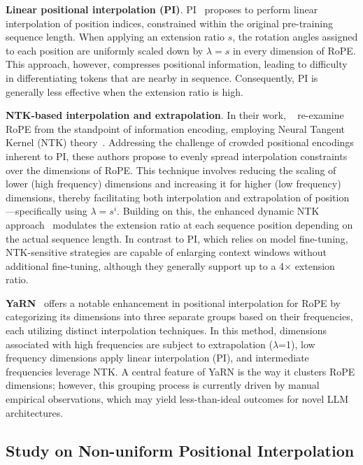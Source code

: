 \textbf{Linear positional interpolation (PI)}. PI~\cite{pi} proposes to perform linear interpolation of position indices, constrained within the original pre-training sequence length. When applying an extension ratio $s$, the rotation angles assigned to each position are uniformly scaled down by $\lambda=s$ in every dimension of RoPE. This approach, however, compresses positional information, leading to difficulty in differentiating tokens that are nearby in sequence. Consequently, PI is generally less effective when the extension ratio is high.

\textbf{NTK-based interpolation and extrapolation}. In their work, ~\cite{ntk,dynamicntk} re-examine RoPE from the standpoint of information encoding, employing Neural Tangent Kernel (NTK) theory~\cite{jacot2018neural,tancik2020fourier}. Addressing the challenge of crowded positional encodings inherent to PI, these authors propose to evenly spread interpolation constraints over the dimensions of RoPE. This technique involves reducing the scaling of lower (high frequency) dimensions and increasing it for higher (low frequency) dimensions, thereby facilitating both interpolation and extrapolation of position—specifically using $\lambda=s^{i}$. Building on this, the enhanced dynamic NTK approach~\cite{dynamicntk} modulates the extension ratio at each sequence position depending on the actual sequence length. In contrast to PI, which relies on model fine-tuning, NTK-sensitive strategies are capable of enlarging context windows without additional fine-tuning, although they generally support up to a 4$\times$ extension ratio.

\textbf{YaRN}~\cite{yarn} offers a notable enhancement in positional interpolation for RoPE by categorizing its dimensions into three separate groups based on their frequencies, each utilizing distinct interpolation techniques. In this method, dimensions associated with high frequencies are subject to extrapolation ($\lambda$=1), low frequency dimensions apply linear interpolation (PI), and intermediate frequencies leverage NTK. A central feature of YaRN is the way it clusters RoPE dimensions; however, this grouping process is currently driven by manual empirical observations, which may yield less-than-ideal outcomes for novel LLM architectures.

\subsection{Study on Non-uniform Positional Interpolation}

